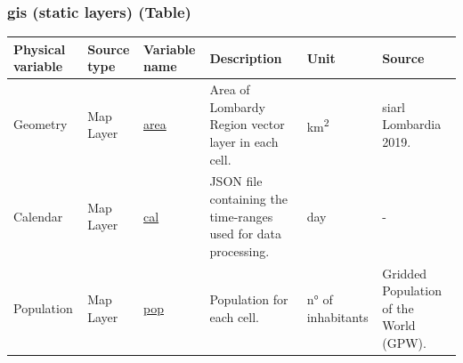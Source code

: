\subsubsection{\acrshort{gis} (static layers) (Table)}

\begin{center}
\setlength{\arrayrulewidth}{1.5pt}
\begin{longtable}{ |p{2.3cm}|p{1.5cm}|p{2.3cm}|p{4cm}|p{1.5cm}|p{2.3cm}| } 
\hline
\textbf{Physical variable} & \textbf{Source type}  & \textbf{Variable name}  & \textbf{Description}  & \textbf{Unit}  & \textbf{Source}\\ 
\hline
\multirow{1}{4em}{Geometry} & Map Layer  & \underline{area} & Area of Lombardy Region vector layer in each cell. \par& km\textsuperscript{2} & \acrshort{siarl} Lombardia 2019.\\ 
\hline
\multirow{1}{4em}{Calendar} & Map Layer  & \underline{cal} & JSON file containing the time-ranges used for data processing. \par& day & -\\ 
\hline

\multirow{1}{4em}{Population} & Map Layer  & \underline{pop} & Population for each cell. & n° of inhabitants& Gridded Population of the World (GPW).\\ \hline


\end{longtable}
\end{center}
